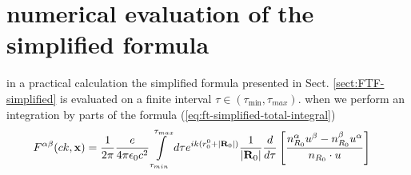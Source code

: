 
\section{numerical evaluation of the simplified formula}

in a practical calculation the simplified formula presented in Sect. \ref{sect:FTF-simplified} is evaluated on a finite interval $\tau\in(\tau_{\min},\tau_{max})$. when we perform an integration by parts of the formula (\ref{eq:ft-simplified-total-integral})
\begin{align}
  F^{\alpha\beta}(c k, {\bf x}) &  = \frac1{2\pi}\frac{e}{4\pi\epsilon_0c^2}\int\limits_{\tau_{min}}^{\tau_{max}} d\tau e^{i k (r_0^0+|{\bf R}_0|)}\frac{1}{|{\bf R}_0|} \frac{d}{d\tau}\left[ \frac{n_{R_0}^{\alpha}u^{\beta}-n_{R_0}^{\beta}u^{\alpha}}{n_{R_0}\cdot u}\right]\label{eq:ft-simplified-total-integral-numeric}
\end{align}

